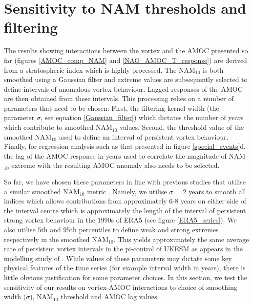 \section{Sensitivity to NAM thresholds and filtering}
\label{sec:sensitivity}

The results showing interactions between the vortex and the AMOC presented so far (figures \ref{AMOC_comp_NAM} and \ref{NAO_AMOC_T_response}) are derived from a stratospheric index which is highly processed. The NAM$_{10}$ is both smoothed using a Gaussian filter and extreme values are subsequently selected to define intervals of anomalous vortex behaviour. Lagged responses of the AMOC are then obtained from these intervals. This processing relies on a number of parameters that need to be chosen: First, the filtering kernel width (the parameter $\sigma$, see equation \ref{Gaussian_filter}) which dictates the number of years which contribute to smoothed NAM$_{10}$ values. Second, the threshold value of the smoothed NAM$_{10}$ used to define an interval of persistent vortex behaviour. Finally, for regression analysis such as that presented in figure \ref{special_events}d, the lag of the AMOC response in years used to correlate the magnitude of NAM$_{10}$ extreme with the resulting AMOC anomaly also needs to be selected. 

So far, we have chosen these parameters in line with previous studies that utilise a similar smoothed NAM$_{10}$ metric \citep{reichlerStratospheric2012b}. Namely, we utilise $\sigma$ = 2 years to smooth all indices which allows contributions from approximately 6-8 years on either side of the interval centre which is approximately the length of the interval of persistent strong vortex behaviour in the 1990s of ERA5 (see figure \ref{ERA5_series}). We also utilise 5th and 95th percentiles to define weak and strong extremes respectively in the smoothed NAM$_{10}$. This yields approximately the same average rate of persistent vortex intervals in the pi-control of UKESM as appears in the modelling study of \cite{reichlerStratospheric2012b}. While values of these parameters may dictate some key physical features of the time series (for example interval width in years), there is little obvious justification for some parameter choices. In this section, we test the sensitivity of our results on vortex-AMOC interactions to choice of smoothing width ($\sigma$), NAM$_{10}$ threshold and AMOC lag values. 

